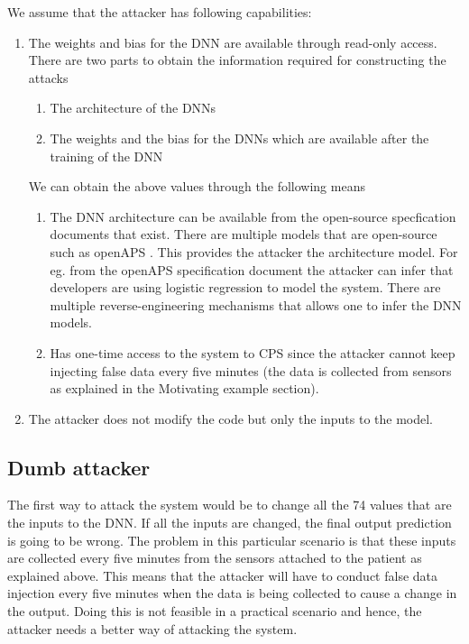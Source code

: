 We assume that the attacker has following capabilities:
\begin{enumerate}
	\item The weights and bias for the DNN are available through read-only access. There are two parts to obtain the information required for constructing the attacks
	\begin{enumerate}
		\item The architecture of the DNNs
		\item The weights and the bias for the DNNs which are available after the training of the DNN
	\end{enumerate}
We can obtain the above values through the following means
\begin{enumerate}
	\item The DNN architecture can be available from the open-source specfication documents that exist. There are multiple models that are open-source such as openAPS \cite{openAPS}. This provides the attacker the architecture model. For eg. from the openAPS specification document the attacker can infer that developers are using  logistic regression to model the system.  
	There are multiple reverse-engineering mechanisms \cite{10.1145/3195970.3196105} that allows one to infer the DNN models.  
	\item Has one-time access to the system to CPS since the attacker cannot keep injecting false data every five minutes (the data is collected from sensors as explained in the Motivating example section).
\end{enumerate}
  
	\item The attacker does not modify the code but only the inputs to the model.
\end{enumerate}

\subsection{Dumb attacker}
The first way to attack the system would be to change all the 74 values that are the inputs to the DNN. If all the inputs are changed, the final output prediction is going to be wrong. The problem in this particular scenario is that these inputs are collected every five minutes from the sensors attached to the patient as explained above. This means that the attacker will have to conduct false data injection every five minutes when the data is being collected to cause a change in the output. Doing this is not feasible in a practical scenario and hence, the attacker needs a better way of attacking the system. 


